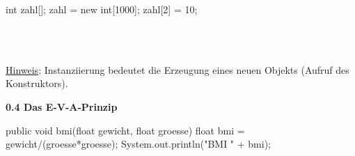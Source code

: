 \documentclass[11pt,a4paper]{article}
\newif\ifloesung
\newlength{\spaceParagraph}
\newlength{\lsgbreite}
\newcommand{\lsg}[2][3cm]{%
  \ifloesung
    \settowidth{\lsgbreite}{\small #2}%
    \ifdim\lsgbreite<#1\relax\setlength{\lsgbreite}{#1}\fi
    \underline{\makebox[\lsgbreite][c]{\textcolor{lsgrot}{\small #2}}}%
  \else
    \luecke[#1]%
  \fi}
\newcommand{\lsgplatz}[2]{\par\noindent
  \begin{minipage}[t][#1][t]{\linewidth}\ifloesung{\small\color{lsgrot}#2\par}\fi\end{minipage}\par}
\begin{document}
\begin{minipage}[t]{0.42\linewidth}
\vspace{0pt}
\begin{java}
int zahl[];
zahl = new int[1000];
zahl[2] = 10;
\end{java}
\end{minipage}\hfill
\begin{minipage}[t]{0.25\linewidth}
\vspace{0pt}\small
\lsg[2.8cm]{Deklaration}\\[2mm]
\lsg[2.8cm]{Initialisierung}\\[2mm]
\lsg[2.8cm]{Wertzuweisung}
\end{minipage}\hfill
\begin{minipage}[t]{0.29\linewidth}
\vspace{0pt}\small
\underline{Hinweis}: Instanziierung bedeutet die Erzeugung eines neuen Objekts (Aufruf des Konstruktors).
\end{minipage}

\vspace{\spaceParagraph}
\textbf{0.4 Das E-V-A-Prinzip}\par\nopagebreak

\begin{minipage}[t]{0.58\linewidth}
\vspace{0pt}
\begin{java}
public void bmi(float gewicht, float groesse)
{
   float bmi = gewicht/(groesse*groesse);
   System.out.println("BMI " + bmi);
}
\end{java}
\end{minipage}\hfill
\begin{minipage}[t]{0.38\linewidth}
\vspace{0pt}
\end{minipage}

\lsgplatz{5mm}{Eingabe: Parameter \code{gewicht} und \code{groesse} -- Verarbeitung: Berechnung von \code{bmi} --
Ausgabe: \code{System.out.println(...)}}
\end{document}
